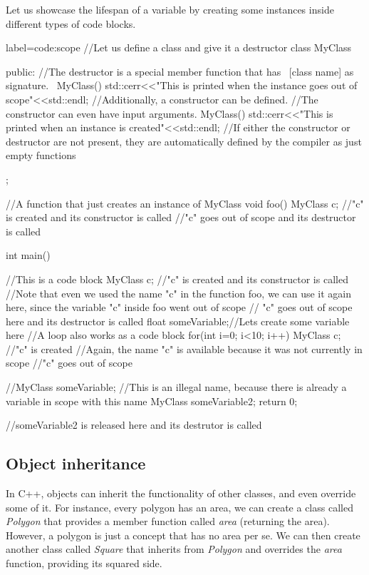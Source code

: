 \documentclass[ twoside,openright,titlepage,numbers=noenddot,%
headinclude,footinclude,cleardoublepage=empty,abstract=on,
BCOR=5mm,paper=a4,fontsize=11pt, dvipsnames
]{scrreprt}
\begin{document}
Let us showcase the lifespan of a variable by creating some instances inside different types of code blocks.
\begin{code2}{label=code:scope}
  //Let us define a class and give it a destructor
  class MyClass{

    public:
    //The destructor is a special member function that has ~[class name] as signature.
    ~MyClass(){
      std::cerr<<"This is printed when the instance goes out of scope"<<std::endl;
    }
    //Additionally, a constructor can be defined.
    //The constructor can even have input arguments.
    MyClass(){
      std::cerr<<"This is printed when an instance is created"<<std::endl;
    }
    //If either the constructor or destructor are not present, they are automatically defined by the compiler as just empty functions
  };

  //A function that just creates an instance of MyClass
  void foo(){
    MyClass c; //"c" is created and its constructor is called
  }//"c" goes out of scope and its destructor is called
  
  int main(){
    {//This is a code block
      MyClass c; //"c" is created and its constructor is called
      //Note that even we used the name "c" in the function foo, we can use it again here, since the variable "c" inside foo went out of scope
    }// "c" goes out of scope here and its destructor is called
    float someVariable;//Lets create some variable here
    //A loop also works as a code block
    for(int i=0; i<10; i++){
      MyClass c; //"c" is created
      //Again, the name "c" is available because it was not currently in scope
    }//"c" goes out of scope

    //MyClass someVariable; //This is an illegal name, because there is already a variable in scope with this name
    MyClass someVariable2;
    return 0;
  }//someVariable2 is released here and its destrutor is called
\end{code2}

\subsection*{Object inheritance}
In C++, objects can inherit the functionality of other classes, and even override some of it. For instance, every polygon has an area, we can create a class called \emph{Polygon} that provides a member function called \emph{area} (returning the area). However, a polygon is just a concept that has no area per se. We can then create another class called \emph{Square} that inherits from \emph{Polygon} and overrides the \emph{area} function, providing its squared side.
\end{document}
